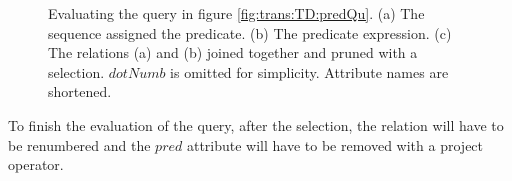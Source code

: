 \begin{myExample}
\begin{figure}[h]
\centering
{}
\quad
{}
\quad
{}
\caption[Evaluating the query in figure \ref{fig:trans:TD:predQu}]{Evaluating the query in figure
\ref{fig:trans:TD:predQu}. (a) The sequence assigned the predicate. (b) The predicate expression. (c) The
relations (a) and (b) joined together and pruned with a selection. $dotNumb$ is omitted for simplicity. Attribute
names are shortened.}
\end{figure}

To finish the evaluation of the query, after the selection, the relation will have to be renumbered and the $pred$
attribute will have to be removed with a \textsf{project} operator.

\end{myExample}